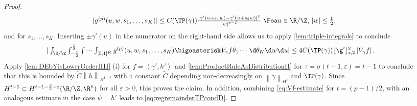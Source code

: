 \begin{proof}
    \begin{align*}\textstyle
        |g^{(p)}(u,w,s_1,\dots,s_K)|\le C(\TP(\gamma))\frac{|\gamma'(u+s_1w)-\gamma'(u+s_2w)|^2}{\left|w \right|^{p-2}}\,\,\Foa u\in\R/\Z,\, \left|w \right|\le \frac{1}{2},
    \end{align*}
    and for $  s_1,\dots,s_K $.
    Inserting $ \pm \gamma'(u) $ in the numerator on the right-hand side allows us to apply \cref{lem:triple-integrals} to conclude 
\begin{equation}\label{eq:Vf-estimate}
\begin{aligned}\textstyle
    &\textstyle|\int_{\R/\Z}\int_{-\frac{1}{2}}^{\frac{1}{2}}\idotsint_{[0,1]^K}g^{(p)}(u,w,s_1,\dots,s_K)\bigoasterisk V_\gamma f \theta_1\cdots\d\theta_K\d w\d u|
    \le 4C(\TP(\gamma))\lfloor\g'\rfloor_{s,2}^2\left|V_\gamma f \right|.
\end{aligned}
\end{equation}
Apply \cref{lem:DEbYisLowerOrderIIII} \textrm{(i)} for $ f=\left\langle \gamma',h' \right\rangle  $ and \cref{lem:ProductRuleAsDistributionII} for $ \tau=\sigma(t-1,\varepsilon)=t-1 $ to conclude that this is bounded by $ \tilde{C}\left\|h \right\|_{H^{1-t}} $ with a constant $ \tilde{C} $ depending non-decreasingly on $ \left\|\gamma \right\|_{H^t} $ and $ \TP(\gamma) $. Since $ H^{t-1}\subset H^{t-1-\frac{p}{2}-\varepsilon} (\R/\Z,\R^n)$ for all $ \varepsilon>0 $, this proves the claim. In addition, combining \cref{eq:Vf-estimate} for $ t=(p-1)/2$, with an analogous estimate in the case $ \psi=h' $ leads to 
\cref{eq:regremainderTPcondD}. 


\end{proof}
